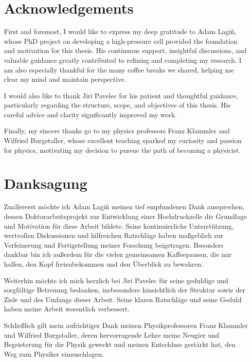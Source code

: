 \section*{Acknowledgements}
First and foremost, I would like to express my deep gratitude to Adam Lagiň, whose PhD project on developing a high-pressure cell provided the foundation and motivation for this thesis. His continuous support, insightful discussions, and valuable guidance greatly contributed to refining and completing my research. I am also especially thankful for the many coffee breaks we shared, helping me clear my mind and maintain perspective.

\vspace{0.5cm}

I would also like to thank Jiri Pavelec for his patient and thoughtful guidance, particularly regarding the structure, scope, and objectives of this thesis. His careful advice and clarity significantly improved my work.

\vspace{0.5cm}

Finally, my sincere thanks go to my physics professors Franz Klammler and Wilfried Burgstaller, whose excellent teaching sparked my curiosity and passion for physics, motivating my decision to pursue the path of becoming a physicist.

\blankpage

\section*{Danksagung}
Zuallererst möchte ich Adam Lagiň meinen tief empfundenen Dank aussprechen, dessen Doktorarbeitsprojekt zur Entwicklung einer Hochdruckzelle die Grundlage und Motivation für diese Arbeit bildete. Seine kontinuierliche Unterstützung, wertvollen Diskussionen und hilfreichen Ratschläge haben maßgeblich zur Verfeinerung und Fertigstellung meiner Forschung beigetragen. Besonders dankbar bin ich außerdem für die vielen gemeinsamen Kaffeepausen, die mir halfen, den Kopf freizubekommen und den Überblick zu bewahren.

\vspace{0.5cm}

Weiterhin möchte ich mich herzlich bei Jiri Pavelec für seine geduldige und sorgfältige Betreuung bedanken, insbesondere hinsichtlich der Struktur sowie der Ziele und des Umfangs dieser Arbeit. Seine klaren Ratschläge und seine Geduld haben meine Arbeit wesentlich verbessert.

\vspace{0.5cm}

Schließlich gilt mein aufrichtiger Dank meinen Physikprofessoren Franz Klammler und Wilfried Burgstaller, deren hervorragende Lehre meine Neugier und Begeisterung für die Physik geweckt und meinen Entschluss gestärkt hat, den Weg zum Physiker einzuschlagen.
\blankpage
